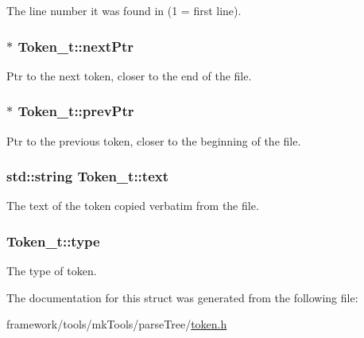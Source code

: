 The line number it was found in (1 = first line). 

\subsubsection[{\texorpdfstring{next\+Ptr}{nextPtr}}]{$\ast$ Token\+\_\+t\+::next\+Ptr}\hypertarget{struct_token__t_a0be03dce42ee8f49413fe312558e79c4}{}\label{struct_token__t_a0be03dce42ee8f49413fe312558e79c4}


Ptr to the next token, closer to the end of the file. 

\subsubsection[{\texorpdfstring{prev\+Ptr}{prevPtr}}]{$\ast$ Token\+\_\+t\+::prev\+Ptr}\hypertarget{struct_token__t_a888cc048a61a7c120a683b833617c9ae}{}\label{struct_token__t_a888cc048a61a7c120a683b833617c9ae}


Ptr to the previous token, closer to the beginning of the file. 

\subsubsection[{\texorpdfstring{text}{text}}]{\setlength{\rightskip}{0pt plus 5cm}std\+::string Token\+\_\+t\+::text}\hypertarget{struct_token__t_a522c94f6add5e3a4ff05d92e1e7a2403}{}\label{struct_token__t_a522c94f6add5e3a4ff05d92e1e7a2403}


The text of the token copied verbatim from the file. 

\subsubsection[{\texorpdfstring{type}{type}}]{ Token\+\_\+t\+::type}\hypertarget{struct_token__t_a2fc2e613dd3946fe8303b3031cf3aecd}{}\label{struct_token__t_a2fc2e613dd3946fe8303b3031cf3aecd}


The type of token. 



The documentation for this struct was generated from the following file\+:\begin{DoxyCompactItemize}
\item 
framework/tools/mk\+Tools/parse\+Tree/\hyperlink{token_8h}{token.\+h}\end{DoxyCompactItemize}
